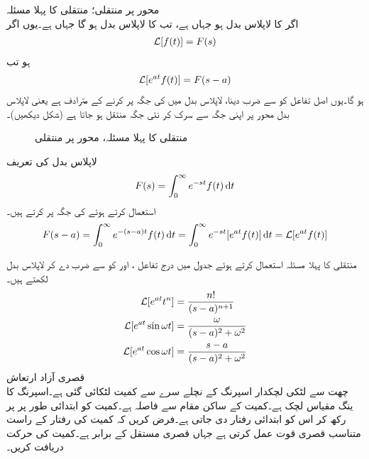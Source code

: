 \quad {} محور پر منتقلی؛ منتقلی کا پہلا مسئلہ\\
اگر  کا لاپلاس بدل  ہو جہاں  ہے، تب  کا لاپلاس بدل  ہو گا جہاں  ہے۔یوں اگر
\begin{align*}
\mathcal{L}[f(t)]=F(s)
\end{align*}
ہو تب 
\begin{align*}
\mathcal{L}[e^{at}f(t)]=F(s-a)
\end{align*}
ہو گا۔یوں اصل تفاعل کو  سے ضرب دینا، لاپلاس بدل میں  کی جگہ  پر کرنے کے مترادف ہے یعنی لاپلاس بدل  محور پر اپنی جگہ سے سرک کر نئی جگہ منتقل ہو جاتا ہے (شکل  دیکھیں)۔ 
\begin{figure}
\centering
{}
\caption{منتقلی کا پہلا مسئلہ،  محور پر منتقلی}
\label{شکل_لاپلاس_تعددی_منتقلی}
\end{figure}
لاپلاس بدل کی تعریف
\begin{align*}
F(s)=\int_{0}^{\infty}e^{-st} f(t)\dif t
\end{align*}
استعمال کرتے ہوئے  کی جگہ  پر کرتے ہیں۔
\begin{align*}
F(s-a)=\int_{0}^{\infty}e^{-(s-a)t} f(t)\dif t=\int_{0}^{\infty}e^{-st} [e^{at}f(t)]\dif t=\Laplace[e^{at}f(t)]
\end{align*}

منتقلی کا پہلا مسئلہ استعمال کرتے ہوئے جدول  میں درج  تفاعل ،  اور  کو  سے ضرب دے کر لاپلاس بدل لکھتے ہیں۔
\begin{align*}
\mathcal{L}[e^{at}t^n]&=\frac{n!}{(s-a)^{n+1}}\\
\mathcal{L}[e^{at}\sin \omega t]&=\frac{\omega}{(s-a)^2+\omega^2}\\
\mathcal{L}[e^{at}\cos \omega t]&=\frac{s-a}{(s-a)^2+\omega^2}
\end{align*} 
\quad قصری آزاد ارتعاش\\
چھت سے لٹکی  لچکدار اسپرنگ کے نچلے سرے سے کمیت  لٹکائی گئی ہے۔اسپرنگ کا ینگ مقیاس لچک  ہے۔کمیت کے ساکن مقام سے فاصلہ   ہے۔کمیت کو ابتدائی طور پر  پر رکھ کر اس کو ابتدائی رفتار  دی جاتی ہے۔فرض کریں کہ کمیت کی رفتار کے راست متناسب قصری قوت عمل کرتی ہے جہاں قصری مستقل  کے برابر ہے۔کمیت کی حرکت دریافت کریں۔


